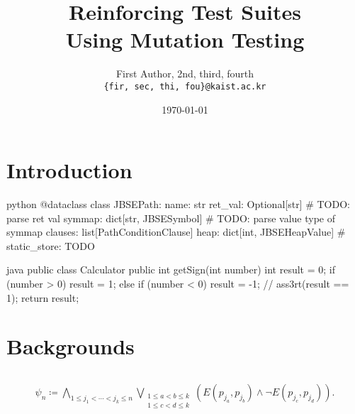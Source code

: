 \documentclass{article}
\title{\Huge\sffamily\titlefont Reinforcing Test Suites\\Using Mutation Testing}
\author{%
\sffamily
First Author, 2nd, third, fourth\\
\texttt{\normalsize\{fir, sec, thi, fou\}@kaist.ac.kr}
}
\date{\sffamily\today}
\begin{document}
\maketitle
\makeinfo

\section{Introduction}

\lipsum[1]

\begin{listingsbox}{python}{\lipsum[5][1]}
@dataclass
class JBSEPath:
    name: str
    ret_val: Optional[str]  # TODO: parse ret val
    symmap: dict[str, JBSESymbol]  # TODO: parse value type of symmap
    clauses: list[PathConditionClause]
    heap: dict[int, JBSEHeapValue]
    # static_store: TODO
\end{listingsbox}

\lipsum[2-3]

\begin{listingsbox}{java}{\lipsum[5][2]}
public class Calculator {
    public int getSign(int number) {
        int result = 0;
        if (number > 0) {
            result = 1;
        } else if (number < 0) {
            result = -1;
        }
        // ass3rt(result == 1);
        return result;
    }
}
\end{listingsbox}

\lipsum[4][1-3] 
\lipsum[4][4-7] 
\lipsum[4][8-12]

\section{Backgrounds}

\subsection{\lipsum[5][3]}

\lipsum[6-7]

\subsection{\lipsum[5][4]}
\subsubsection{\lipsum[5][5]}

\lipsum[9]
\begin{align*}
    \psi_n \coloneqq \bigwedge_{1\le j_1<\cdots<j_k\le n} \bigvee_{\substack{1\le a<b\le k \\ 1\le c<d\le k}} (E(p_{j_a},p_{j_b})\land \lnot E(p_{j_c}, p_{j_d})).
\end{align*}
\lipsum[10]
\end{document}
